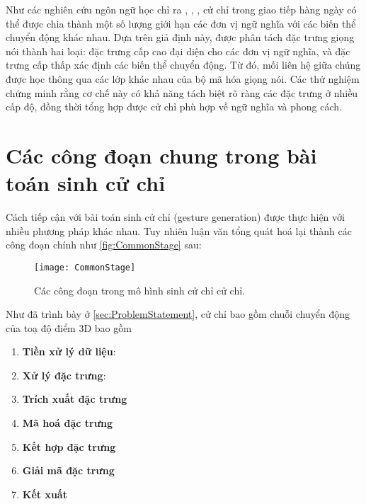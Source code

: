 Như các nghiên cứu ngôn ngữ học chỉ ra \cite{kipp2005gesture}, \cite{neff2008gesture}, \cite{webb1997linguistic}, cử chỉ trong giao tiếp hàng ngày có thể được chia thành một số lượng giới hạn các đơn vị ngữ nghĩa với các biến thể chuyển động khác nhau. Dựa trên giả định này, được phân tách đặc trưng giọng nói thành hai loại: đặc trưng cấp cao đại diện cho các đơn vị ngữ nghĩa, và đặc trưng cấp thấp xác định các biến thể chuyển động. Từ đó, mối liên hệ giữa chúng được học thông qua các lớp khác nhau của bộ mã hóa giọng nói. Các thử nghiệm chứng minh rằng cơ chế này có khả năng tách biệt rõ ràng các đặc trưng ở nhiều cấp độ, đồng thời tổng hợp được cử chỉ phù hợp về ngữ nghĩa và phong cách.


\section{Các công đoạn chung trong bài toán sinh cử chỉ}
\label{sec:commonstage}

Cách tiếp cận với bài toán sinh cử chỉ (gesture generation) được thực hiện với nhiều phương pháp khác nhau. Tuy nhiên luận văn tổng quát hoá lại thành các công đoạn chính như \autoref{fig:CommonStage} sau:

\begin{figure}[H]
	\centering
	\texttt{[image: CommonStage]}
	\caption{Các công đoạn trong mô hình sinh cử chỉ cử chỉ.}
	\label{fig:CommonStage}
\end{figure}

Như đã trình bày ở \autoref{sec:ProblemStatement}, cử chỉ bao gồm chuỗi chuyển động của toạ độ điểm 3D bao gồm 

\begin{enumerate}[label=\textbf{\arabic*.}]
	\item \textbf{Tiền xử lý dữ liệu}: 
	
	\item \textbf{Xử lý đặc trưng}: 
	
	\item \textbf{Trích xuất đặc trưng}
	
	\item \textbf{Mã hoá đặc trưng}
	
	\item \textbf{Kết hợp đặc trưng}
	
	\item \textbf{Giải mã đặc trưng}
	
	\item \textbf{Kết xuất}
\end{enumerate}


